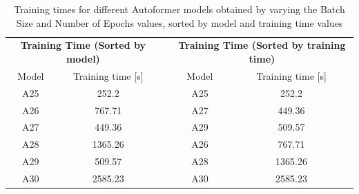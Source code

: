 \begin{table}[]
    \begin{tabular}{ccccc}
    \multicolumn{2}{c}{\textbf{Training   Time (Sorted by model)}} &  & \multicolumn{2}{c}{\textbf{Training Time (Sorted   by training time)}} \\
    Model             & Training time {[}s{]}                      &  & Model                 & Training time {[}s{]}                          \\
    A25               & \cellcolor[HTML]{63BE7B}252.2              &  & A25                   & \cellcolor[HTML]{63BE7B}252.2                  \\
    A26               & \cellcolor[HTML]{FFE383}767.71             &  & A27                   & \cellcolor[HTML]{B2D47F}449.36                 \\
    A27               & \cellcolor[HTML]{B2D47F}449.36             &  & A29                   & \cellcolor[HTML]{CADB80}509.57                 \\
    A28               & \cellcolor[HTML]{FDBB7B}1365.26            &  & A26                   & \cellcolor[HTML]{FFE383}767.71                 \\
    A29               & \cellcolor[HTML]{CADB80}509.57             &  & A28                   & \cellcolor[HTML]{FDBB7B}1365.26                \\
    A30               & \cellcolor[HTML]{F8696B}2585.23            &  & A30                   & \cellcolor[HTML]{F8696B}2585.23               
    \end{tabular}
    \caption{Training times for different Autoformer models obtained by varying the Batch Size and Number of Epochs values, sorted by model and training time values}
    \label{A5_T}
    \end{table}

